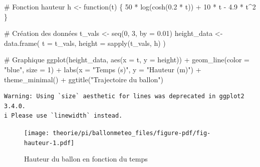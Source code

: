 \documentclass[
  12pt,
  letterpaper,
]{book}
\newenvironment{Shaded}{}{}
\newcommand{\AttributeTok}[1]{\textcolor[rgb]{0.84,0.23,0.29}{#1}}
\newcommand{\CommentTok}[1]{\textcolor[rgb]{0.42,0.45,0.49}{#1}}
\newcommand{\ControlFlowTok}[1]{\textcolor[rgb]{0.84,0.23,0.29}{#1}}
\newcommand{\DecValTok}[1]{\textcolor[rgb]{0.00,0.36,0.77}{#1}}
\newcommand{\FloatTok}[1]{\textcolor[rgb]{0.00,0.36,0.77}{#1}}
\newcommand{\FunctionTok}[1]{\textcolor[rgb]{0.44,0.26,0.76}{#1}}
\newcommand{\NormalTok}[1]{\textcolor[rgb]{0.14,0.16,0.18}{#1}}
\newcommand{\OtherTok}[1]{\textcolor[rgb]{0.44,0.26,0.76}{#1}}
\newcommand{\SpecialCharTok}[1]{\textcolor[rgb]{0.00,0.36,0.77}{#1}}
\newcommand{\StringTok}[1]{\textcolor[rgb]{0.01,0.18,0.38}{#1}}
\theoremstyle{remark}
\begin{document}
\begin{Shaded}
\begin{Highlighting}[]
\CommentTok{\# Fonction hauteur}
\NormalTok{h }\OtherTok{\textless{}{-}} \ControlFlowTok{function}\NormalTok{(t) \{}
  \DecValTok{50} \SpecialCharTok{*} \FunctionTok{log}\NormalTok{(}\FunctionTok{cosh}\NormalTok{(}\FloatTok{0.2} \SpecialCharTok{*}\NormalTok{ t)) }\SpecialCharTok{+} \DecValTok{10} \SpecialCharTok{*}\NormalTok{ t }\SpecialCharTok{{-}} \FloatTok{4.9} \SpecialCharTok{*}\NormalTok{ t}\SpecialCharTok{\^{}}\DecValTok{2}
\NormalTok{\}}

\CommentTok{\# Création des données}
\NormalTok{t\_vals }\OtherTok{\textless{}{-}} \FunctionTok{seq}\NormalTok{(}\DecValTok{0}\NormalTok{, }\DecValTok{3}\NormalTok{, }\AttributeTok{by =} \FloatTok{0.01}\NormalTok{)}
\NormalTok{height\_data }\OtherTok{\textless{}{-}} \FunctionTok{data.frame}\NormalTok{(}
  \AttributeTok{t =}\NormalTok{ t\_vals,}
  \AttributeTok{height =} \FunctionTok{sapply}\NormalTok{(t\_vals, h)}
\NormalTok{)}

\CommentTok{\# Graphique}
\FunctionTok{ggplot}\NormalTok{(height\_data, }\FunctionTok{aes}\NormalTok{(}\AttributeTok{x =}\NormalTok{ t, }\AttributeTok{y =}\NormalTok{ height)) }\SpecialCharTok{+}
  \FunctionTok{geom\_line}\NormalTok{(}\AttributeTok{color =} \StringTok{"blue"}\NormalTok{, }\AttributeTok{size =} \DecValTok{1}\NormalTok{) }\SpecialCharTok{+}
  \FunctionTok{labs}\NormalTok{(}\AttributeTok{x =} \StringTok{"Temps (s)"}\NormalTok{, }\AttributeTok{y =} \StringTok{"Hauteur (m)"}\NormalTok{) }\SpecialCharTok{+}
  \FunctionTok{theme\_minimal}\NormalTok{() }\SpecialCharTok{+}
  \FunctionTok{ggtitle}\NormalTok{(}\StringTok{"Trajectoire du ballon"}\NormalTok{)}
\end{Highlighting}
\end{Shaded}

\begin{verbatim}
Warning: Using `size` aesthetic for lines was deprecated in ggplot2 3.4.0.
i Please use `linewidth` instead.
\end{verbatim}

\begin{figure}[H]

{\centering \texttt{[image: theorie/pi/ballonmeteo\_files/figure-pdf/fig-hauteur-1.pdf]}

}

\caption{\label{fig-hauteur}Hauteur du ballon en fonction du temps}

\end{figure}
\end{document}
